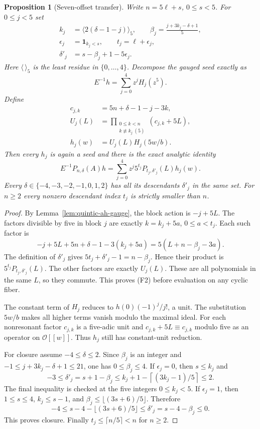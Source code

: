 \documentclass[11pt]{article}
\newtheorem{proposition}{Proposition}
\newcommand{\OO}{\mathcal O}
\begin{document}
\begin{proposition}[Seven-offset transfer]\label{prop:quintic-seven-offset}
Write $n=5\ell+s$, $0\le s<5$.  For $0\le j<5$ set
\[
 \begin{split}
 k_j&=\langle2(\delta-1-j)\rangle_5,\qquad
 \beta_j=\frac{j+3k_j-\delta+1}{5},\\
 \epsilon_j&=\mathbf1_{k_j<s},\qquad t_j=\ell+\epsilon_j,\\
 \delta'_j&=s-\beta_j+1-5\epsilon_j .
 \end{split}                                                    \tag{F1}
\]
Here $\langle\,\rangle_5$ is the least residue in $\{0,\ldots,4\}$.
Decompose the gauged seed exactly as
\[
 E^{-1}h=\sum_{j=0}^4z^jH_j(z^5).
\]
Define
\[
 \begin{split}
 c_{j,k}&=5n+\delta-1-j-3k,\\
 U_j(L)&=\prod_{\substack{0\le k<n\\k\not\equiv k_j\ (5)}}
                   (c_{j,k}+5L),\\
 h_j(w)&=U_j(L)H_j(5w/b).
 \end{split}
\]
Then every $h_j$ is again a seed and there is the exact analytic
identity
\[
 E^{-1}P_{n,\delta}(A)h
   =\sum_{j=0}^4 z^j5^{t_j}
                     P_{t_j,\delta'_j}(L)h_j(w).                 \tag{F2}
\]
Every $\delta\in\{-4,-3,-2,-1,0,1,2\}$ has all its descendants
$\delta'_j$ in the same set.  For $n\ge2$ every nonzero descendant
index $t_j$ is strictly smaller than $n$.
\end{proposition}
\begin{proof}
By Lemma~\ref{lem:quintic-ah-gauge}, the block action is $-j+5L$.
The factors divisible by five in block $j$ are exactly
$k=k_j+5a$, $0\le a<t_j$.  Each such factor is
\[
 -j+5L+5n+\delta-1-3(k_j+5a)
       =5(L+n-\beta_j-3a).
\]
The definition of $\delta'_j$ gives
$5t_j+\delta'_j-1=n-\beta_j$.  Hence their product is
$5^{t_j}P_{t_j,\delta'_j}(L)$.  The other factors are exactly
$U_j(L)$.  These are all polynomials in the same $L$, so they
commute.  This proves (F2) before evaluation on any cyclic fiber.

The constant term of $H_j$ reduces to
$h(0)(-1)^j/j!$, a unit.  The substitution $5w/b$ makes all
higher terms vanish modulo the maximal ideal.  For each
nonresonant factor $c_{j,k}$ is a five-adic unit and
$c_{j,k}+5L\equiv c_{j,k}$ modulo five as an operator on
$\OO[[w]]$.  Thus $h_j$ still has constant-unit reduction.

For closure assume $-4\le\delta\le2$.  Since $\beta_j$ is an
integer and
$-1\le j+3k_j-\delta+1\le21$, one has $0\le\beta_j\le4$.
If $\epsilon_j=0$, then $s\le k_j$ and
\[
 -3\le\delta'_j=s+1-\beta_j
 \le k_j+1-\left\lceil(3k_j-1)/5\right\rceil\le2 .
\]
The final inequality is checked at the five integers $0\le k_j<5$.
If $\epsilon_j=1$, then $1\le s\le4$, $k_j\le s-1$, and
$\beta_j\le\lfloor(3s+6)/5\rfloor$.  Therefore
\[
 -4\le s-4-\lfloor(3s+6)/5\rfloor
        \le\delta'_j=s-4-\beta_j\le0 .
\]
This proves closure.  Finally
$t_j\le\lceil n/5\rceil<n$ for $n\ge2$.
\end{proof}
\end{document}
